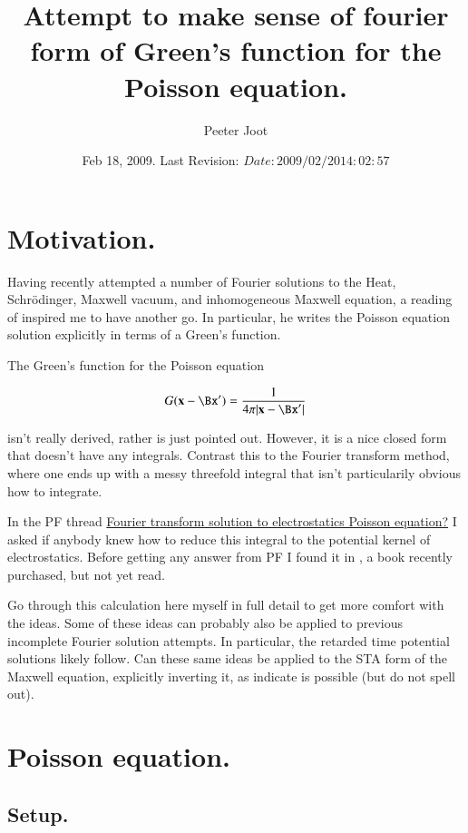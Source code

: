 \documentclass{article}
\title{ Attempt to make sense of fourier form of Green's function for the Poisson equation. }
\author{Peeter Joot}
\date{ Feb 18, 2009.  Last Revision: $Date: 2009/02/20 14:02:57 $ }
\begin{document}
\maketitle{}
\tableofcontents

\section{ Motivation.}

Having recently attempted a number of Fourier solutions to the Heat, Schr\"{o}dinger, Maxwell vacuum, and inhomogeneous Maxwell equation, a reading
of \cite{mjPerryElectrodynamics} inspired me to have another go.  In particular, he writes the Poisson equation solution explicitly in terms of a Green's 
function.

The Green's function for the Poisson equation

\begin{align}
G(\mathbf{x} - \Bx') = \frac{1}{4\pi\lvert{\mathbf{x} -\Bx'}\rvert}
\end{align}

isn't really derived, rather is just pointed out.  However, it is a nice closed form that doesn't have any integrals.
Contrast this to the Fourier transform method, where one ends up with a messy threefold 
integral that isn't particularily obvious how to integrate.

In the PF thread \href{http://www.physicsforums.com/showthread.php?t=293550}{Fourier transform solution to electrostatics Poisson equation?}
I asked if anybody knew how to reduce this integral to the
potential kernel of electrostatics.  Before getting any answer from PF I found it in 
\cite{byron1992mca}, a book recently purchased, but not yet read.


Go through this calculation here myself in full detail to get more comfort with the ideas.  Some of these ideas can probably also be applied to 
previous incomplete Fourier solution attempts.  In particular, the retarded time potential solutions likely follow.
Can these same ideas be applied to the STA form of the Maxwell equation, explicitly inverting it, as 
\cite{doran2003gap} indicate is possible (but do not spell out).

\section{ Poisson equation. }
\subsection{ Setup. }
\end{document}
